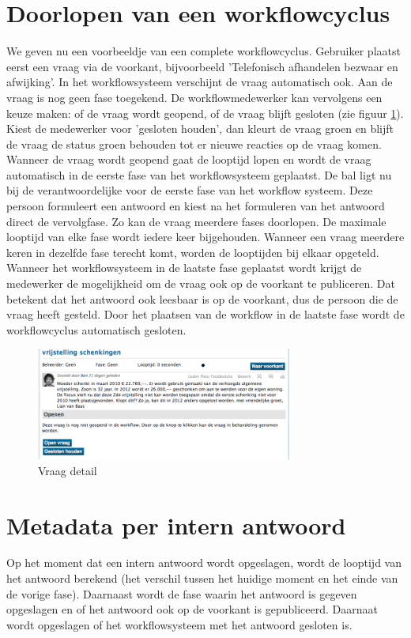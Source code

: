 \documentclass[12pt]{article}
\begin{document}
\section{Doorlopen van een workflowcyclus}
We geven nu een voorbeeldje van een complete workflowcyclus. Gebruiker plaatst eerst een vraag via de voorkant, bijvoorbeeld 'Telefonisch afhandelen bezwaar en afwijking'. In het workflowsysteem verschijnt de vraag automatisch ook. Aan de vraag is nog geen fase toegekend. De workflowmedewerker kan vervolgens een keuze maken: of de vraag wordt geopend, of de vraag blijft gesloten (zie figuur \ref{fig:question-detail}). Kiest de medewerker voor 'gesloten houden', dan kleurt de vraag groen en blijft de vraag de status groen behouden tot er nieuwe reacties op de vraag komen. Wanneer de vraag wordt geopend gaat de looptijd lopen en wordt de vraag automatisch in de eerste fase van het workflowsysteem geplaatst. De bal ligt nu bij de verantwoordelijke voor de eerste fase van het workflow systeem. Deze persoon formuleert een antwoord en kiest na het formuleren van het antwoord direct de vervolgfase. Zo kan de vraag meerdere fases doorlopen. De maximale looptijd van elke fase wordt iedere keer bijgehouden. Wanneer een vraag meerdere keren in dezelfde fase terecht komt, worden de looptijden bij elkaar opgeteld. Wanneer het workflowsysteem in de laatste fase geplaatst wordt krijgt de medewerker de mogelijkheid om de vraag ook op de voorkant te publiceren. Dat betekent dat het antwoord ook leesbaar is op de voorkant, dus de persoon die de vraag heeft gesteld. Door het plaatsen van de workflow in de laatste fase wordt de workflowcyclus automatisch gesloten.

\begin{figure}
  \centering
  \includegraphics[width=0.75\textwidth]{img/detail-question.png}
  \caption{Vraag detail}
  \label{fig:question-detail}
\end{figure}

\section{Metadata per intern antwoord}
Op het moment dat een intern antwoord wordt opgeslagen, wordt de looptijd van het antwoord berekend (het verschil tussen het huidige moment en het einde van de vorige fase). Daarnaast wordt de fase waarin het antwoord is gegeven opgeslagen en of het antwoord ook op de voorkant is gepubliceerd. Daarnaat wordt opgeslagen of het workflowsysteem met het antwoord gesloten is.
\end{document}
